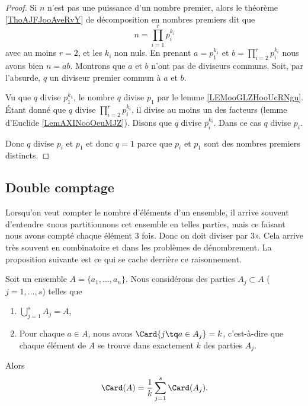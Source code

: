 \begin{proof}
	Si \( n\) n'est pas une puissance d'un nombre premier, alors le théorème \ref{ThoAJFJooAveRvY} de décomposition en nombres premiers dit que
	\begin{equation}
		n=\prod_{i=1}^rp_i^{k_i}
	\end{equation}
	avec au moins \( r=2\), et les \( k_i\) non nuls. En prenant \( a=p_1^{k_1}\) et \( b=\prod_{i=2}^rp_i^{k_i}\) nous avons bien \( n=ab\). Montrons que \( a\) et \( b\) n'ont pas de diviseurs communs. Soit, par l'absurde, \( q\) un diviseur premier commun à \( a\) et \( b\).

	Vu que \( q\) divise \( p_1^{k_1}\), le nombre \( q\) divise \( p_1\) par le lemme \ref{LEMooGLZHooUcRNgu}. Étant donné que \( q\) divise \( \prod_{i=2}^rp_i^{k_i}\), il divise au moins un des facteurs (lemme d'Euclide \ref{LemAXINooOeuMJZ}). Disons que \( q\) divise \( p_i^{k_i}\). Dans ce cas \( q\) divise \( p_i\).

	Donc \( q\) divise \( p_i\) et \( p_1\) et donc \( q=1\) parce que \( p_i\) et \( p_1\) sont des nombres premiers distincts.
\end{proof}

\subsection{Double comptage}

Lorsqu'on veut compter le nombre d'éléments d'un ensemble, il arrive souvent d'entendre «nous partitionnons cet ensemble en telles parties, mais ce faisant nous avons compté chaque élément 3 fois. Donc on doit diviser par 3». Cela arrive très souvent en combinatoire et dans les problèmes de dénombrement. La proposition suivante est ce qui se cache derrière ce raisonnement.

\begin{proposition}	\label{PROPooURPFooYSdyKW}
	Soit un ensemble \( A=\{ a_1,\ldots,a_n \}\). Nous considérons des parties \( A_j\subset A\) (\( j=1,\ldots,s\)) telles que
	\begin{enumerate}
		\item
		      \( \bigcup_{j=1}^sA_j=A\),
		\item
		      Pour chaque \( a\in A\), nous avons \( \Card\{ j\tq a\in A_j \}=k\), c'est-à-dire que chaque élément de \( A\) se trouve dans exactement \( k\) des parties \( A_j\).
	\end{enumerate}
	Alors
	\begin{equation}
		\Card(A)=\frac{1}{ k}\sum_{j=1}^s\Card(A_j).
	\end{equation}
\end{proposition}

